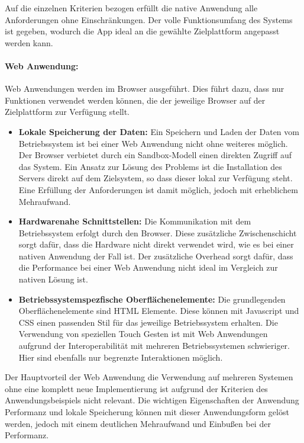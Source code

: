 Auf die einzelnen Kriterien bezogen erfüllt die native Anwendung alle Anforderungen ohne Einschränkungen. Der volle Funktionsumfang des Systems ist gegeben, wodurch die App ideal an die gewählte Zielplattform angepasst werden kann.

\paragraph{Web Anwendung: } Web Anwendungen werden im Browser ausgeführt. 
 Dies führt dazu, dass nur Funktionen verwendet werden können, die der jeweilige Browser auf der Zielplattform zur Verfügung stellt. 
 \begin{itemize}
 \item \textbf{Lokale Speicherung der Daten:} Ein Speichern und Laden der Daten vom Betriebssystem ist bei einer Web Anwendung nicht ohne weiteres möglich. Der Browser verbietet durch ein Sandbox-Modell einen direkten Zugriff auf das System.  Ein Ansatz zur Lösung des Problems ist die Installation des Servers direkt auf dem Zielsystem, so dass dieser lokal zur Verfügung steht. Eine Erfüllung der Anforderungen ist damit möglich, jedoch mit erheblichem Mehraufwand. 
 
 \item \textbf{Hardwarenahe Schnittstellen:} Die Kommunikation mit dem Betriebssystem erfolgt durch den Browser. Diese zusätzliche Zwischenschicht sorgt dafür, dass die Hardware nicht direkt verwendet wird, wie es bei einer nativen Anwendung der Fall ist. Der zusätzliche Overhead sorgt dafür, dass die Performance bei einer Web Anwendung nicht ideal im Vergleich zur nativen Lösung ist.
 
 \item \textbf{Betriebssystemspezfische Oberflächenelemente:} Die grundlegenden Oberflächenelemente sind HTML Elemente. Diese können mit Javascript und CSS einen passenden Stil für das jeweilige Betriebssystem erhalten. Die Verwendung von speziellen Touch Gesten ist mit Web Anwendungen aufgrund der Interoperabilität mit mehreren Betriebssystemen schwieriger. Hier sind ebenfalls nur begrenzte Interaktionen möglich.
 
 \end{itemize}
 Der Hauptvorteil der Web Anwendung die Verwendung auf mehreren Systemen ohne eine komplett neue Implementierung ist aufgrund der Kriterien des Anwendungsbeispiels nicht relevant. Die wichtigen Eigenschaften der Anwendung Performanz und lokale Speicherung können mit dieser Anwendungsform gelöst werden, jedoch mit einem deutlichen Mehraufwand und Einbußen bei der Performanz.


